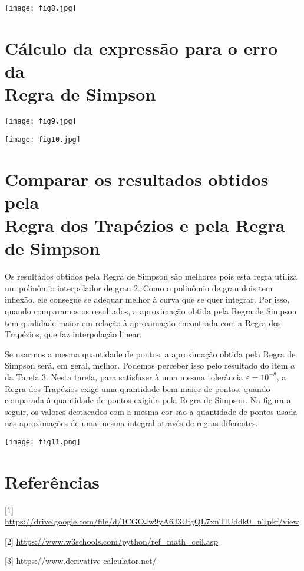 \documentclass[12pt, a4paper]{article}
\begin{document}
	\texttt{[image: fig8.jpg]}
	
	\section*{Cálculo da expressão para o erro da \\Regra de Simpson}
	
	\texttt{[image: fig9.jpg]}
	
	\texttt{[image: fig10.jpg]}
	
	\section*{Comparar os resultados obtidos pela \\Regra dos Trapézios e pela Regra de Simpson}
	
	Os resultados obtidos pela Regra de Simpson são melhores pois esta regra utiliza um polinômio interpolador de grau $2$. Como o polinômio de grau dois tem inflexão, ele consegue se adequar melhor à curva que se quer integrar. Por isso, quando comparamos os resultados, a aproximação obtida pela Regra de Simpson tem qualidade maior em relação à aproximação encontrada com a Regra dos Trapézios, que faz interpolação linear. 
	
	Se usarmos a mesma quantidade de pontos, a aproximação obtida pela Regra de Simpson será, em geral, melhor. Podemos perceber isso pelo resultado do item $a$ da Tarefa $3$. Nesta tarefa, para satisfazer à uma mesma tolerância $\varepsilon = 10^{-8}$, a Regra dos Trapézios exige uma quantidade bem maior de pontos, quando comparada à quantidade de pontos exigida pela Regra de Simpson.
	Na figura a seguir, os valores destacados com a mesma cor são a quantidade de pontos usada nas aproximações de uma mesma integral através de regras diferentes.
	\begin{center}
		\texttt{[image: fig11.png]}
	\end{center}


	\newpage
	\section*{Referências}
	
	\vspace{20pt}
	
	[1] \url{https://drive.google.com/file/d/1CGOJw9yA6J3UfgQL7xnTlUddk0_nTpkf/view}
	
	\vspace{5pt}
	
	[2] \url{https://www.w3schools.com/python/ref_math_ceil.asp}
	
	\vspace{5pt}
	
	[3] \url{https://www.derivative-calculator.net/}
	
	
	
	
\end{document}
